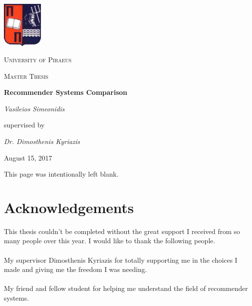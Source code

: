 \documentclass{article}
\begin{document}
	\begin{titlepage}
		\centering
		\includegraphics[width=0.15\textwidth]{images/UniversityOfPiraeusLogo.png}\par\vspace{1cm}
		{\scshape\LARGE University of Piraeus \par}
		\vspace{1cm}
		{\scshape\Large Master Thesis\par}
		\vspace{1.5cm}
		{\huge\bfseries Recommender Systems Comparison\par}
		\vspace{2cm}
		{\Large\itshape Vasileios Simeonidis\par}
		\vspace{7cm}
		supervised by\par
		\textit{Dr. Dimosthenis Kyriazis}
		\vfill
		{\large August 15, 2017\par}
	\end{titlepage}


\newpage
\tableofcontents
{}
\newpage
{}
\begin{center}
This page was intentionally left blank.
\end{center}
\newpage
\section*{Acknowledgements}

\paragraph{} This thesis couldn't be completed without the great support I received from so many people over this year. I would like to thank the following people.

\paragraph{} My supervisor Dimosthenis Kyriazis for totally supporting me in the choices I made and giving me the freedom I was needing.

\paragraph{} My friend and fellow student for helping me understand the field of recommender systems.
\end{document}
